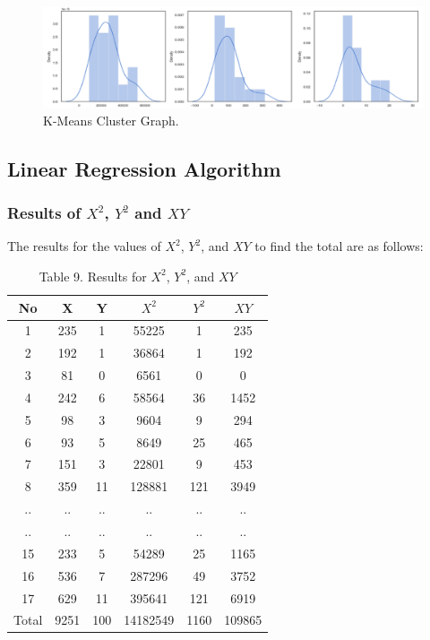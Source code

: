 \documentclass[conference]{IEEEtran}
\begin{document}
    \begin{figure}[H]
        \centerline{\includegraphics[width=\linewidth]{fig3.png}}
        \caption{K-Means Cluster Graph.}
        \label{fig3}
    \end{figure}

    \subsection{Linear Regression Algorithm}
\subsubsection{Results of $X^2$, $Y^2$ and $XY$}
The results for the values of $X^2$, $Y^2$, and $XY$ to find the total are as follows:

\begin{table}[H]
    \centering
    \begin{tabular}{|c|c|c|c|c|c|}
    \hline
    \textbf{No} & \textbf{X} & \textbf{Y} & \textbf{$X^2$} & \textbf{$Y^2$} & \textbf{$XY$} \\ \hline
    1 & 235 & 1 & 55225 & 1 & 235 \\ \hline
    2 & 192 & 1 & 36864 & 1 & 192 \\ \hline
    3 & 81 & 0 & 6561 & 0 & 0 \\ \hline
    4 & 242 & 6 & 58564 & 36 & 1452 \\ \hline
    5 & 98 & 3 & 9604 & 9 & 294 \\ \hline
    6 & 93 & 5 & 8649 & 25 & 465 \\ \hline
    7 & 151 & 3 & 22801 & 9 & 453 \\ \hline
    8 & 359 & 11 & 128881 & 121 & 3949 \\ \hline
    .. & .. & .. & .. & .. & ..\\ \hline
    .. & .. & .. & .. & .. & ..\\ \hline
    15 & 233 & 5 & 54289 & 25 & 1165\\ \hline
    16 & 536 & 7 & 287296 & 49 & 3752\\ \hline
    17 & 629 & 11 & 395641 & 121 & 6919 \\ \hline
    Total & 9251 & 100 & 14182549 & 1160 & 109865 \\ \hline
    \end{tabular}
    \caption{Table 9. Results for $X^2$, $Y^2$, and $XY$}
    \label{tab:my_label4}
\end{table}
\end{document}
